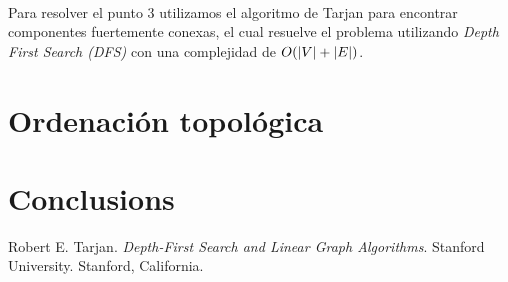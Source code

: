\documentclass{article}
\DeclarePairedDelimiter\abs{\lvert}{\rvert}%
\begin{document}
\paragraph{}Para resolver el punto 3 utilizamos el algoritmo de Tarjan\cite{tarjan} para encontrar componentes fuertemente conexas,
el cual resuelve el problema utilizando \textit{Depth First Search (DFS)} con una complejidad de $ O(\abs{V} + \abs{E}) $.

\section{Ordenación topológica}

\section{Conclusions}\label{conclusions}


\begin{thebibliography}{9}
 Robert E. Tarjan. \textit{Depth-First Search and Linear Graph Algorithms}.
Stanford University. Stanford, California.
\end{thebibliography}
\end{document}
